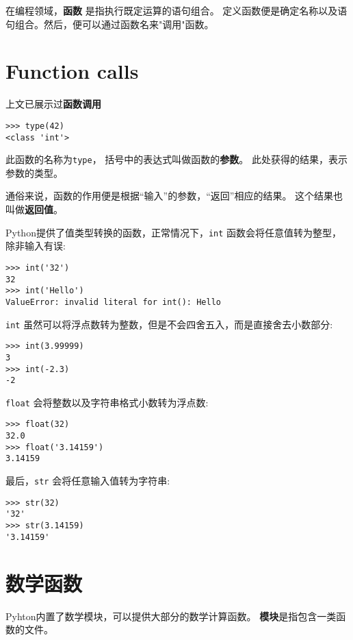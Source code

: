 \documentclass[10pt]{book}
\begin{document}
在编程领域，{\bf 函数} 是指执行既定运算的语句组合。
定义函数便是确定名称以及语句组合。然后，便可以通过函数名来"调用"函数。

\section{Function calls}
\label{functionchap}

上文已展示过{\bf 函数调用}

\begin{verbatim}
>>> type(42)
<class 'int'>
\end{verbatim}
%
此函数的名称为{\tt type}， 括号中的表达式叫做函数的{\bf 参数}。
此处获得的结果，表示参数的类型。

通俗来说，函数的作用便是根据“输入”的参数，“返回”相应的结果。
这个结果也叫做{\bf 返回值}。

Python提供了值类型转换的函数，正常情况下，{\tt int} 函数会将任意值转为整型，
除非输入有误:

\begin{verbatim}
>>> int('32')
32
>>> int('Hello')
ValueError: invalid literal for int(): Hello
\end{verbatim}
%
{\tt int} 虽然可以将浮点数转为整数，但是不会四舍五入，而是直接舍去小数部分:

\begin{verbatim}
>>> int(3.99999)
3
>>> int(-2.3)
-2
\end{verbatim}
%
{\tt float} 会将整数以及字符串格式小数转为浮点数:

\begin{verbatim}
>>> float(32)
32.0
>>> float('3.14159')
3.14159
\end{verbatim}
%
最后，{\tt str} 会将任意输入值转为字符串:

\begin{verbatim}
>>> str(32)
'32'
>>> str(3.14159)
'3.14159'
\end{verbatim}
%

\section{数学函数}

Pyhton内置了数学模块，可以提供大部分的数学计算函数。
{\bf 模块}是指包含一类函数的文件。
\end{document}
